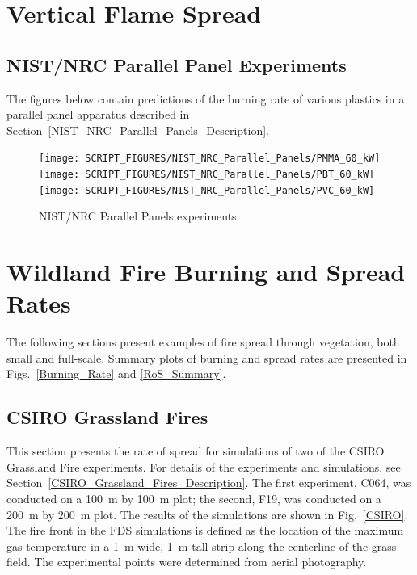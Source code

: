 \section{Vertical Flame Spread}

\subsection{NIST/NRC Parallel Panel Experiments}

The figures below contain predictions of the burning rate of various plastics in a parallel panel apparatus described in Section~\ref{NIST_NRC_Parallel_Panels_Description}.

\begin{figure}[!ht]
\centering
\texttt{[image: SCRIPT\_FIGURES/NIST\_NRC\_Parallel\_Panels/PMMA\_60\_kW]} \\
\texttt{[image: SCRIPT\_FIGURES/NIST\_NRC\_Parallel\_Panels/PBT\_60\_kW]} \\
\texttt{[image: SCRIPT\_FIGURES/NIST\_NRC\_Parallel\_Panels/PVC\_60\_kW]}
\caption[NIST/NRC Parallel Panels experiments]{NIST/NRC Parallel Panels experiments.}
\label{NIST_NRC_PP_HRR}
\end{figure}


\clearpage

\section{Wildland Fire Burning and Spread Rates}
\label{WUI}

The following sections present examples of fire spread through vegetation, both small and full-scale. Summary plots of burning and spread rates are presented in Figs.~\ref{Burning_Rate} and \ref{RoS_Summary}.


\subsection{CSIRO Grassland Fires}

This section presents the rate of spread for simulations of two of the CSIRO Grassland Fire experiments. For details of the experiments and simulations, see Section~\ref{CSIRO_Grassland_Fires_Description}. The first experiment, C064, was conducted on a 100~m by 100~m plot; the second, F19, was conducted on a 200~m by 200~m plot. The results of the simulations are shown in Fig.~\ref{CSIRO}. The fire front in the FDS simulations is defined as the location of the maximum gas temperature in a 1~m wide, 1~m tall strip along the centerline of the grass field. The experimental points were determined from aerial photography.

